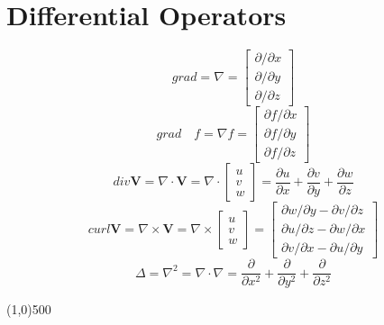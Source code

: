 \documentclass[12pt]{extarticle}
\begin{document}
\section*{Differential Operators}
\begin{equation}
grad = \nabla = \begin{bmatrix}
       \partial/\partial x           \\[0.3em]
       \partial/\partial y  \\[0.3em]
       \partial/\partial z
     \end{bmatrix}
\end{equation}
\begin{equation}
grad \quad f = \nabla f = \begin{bmatrix}
       \partial f/\partial x           \\[0.3em]
       \partial f/\partial y  \\[0.3em]
       \partial f/\partial z
     \end{bmatrix}
\end{equation}
\begin{equation}
div \textbf{V} = \nabla \cdot  \textbf{V} = \nabla \cdot  \begin{bmatrix}
       u           \\[0.3em]
       v  \\[0.3em]
       w
     \end{bmatrix} = \frac{\partial u}{\partial x} + \frac{\partial v}{\partial y} + \frac{\partial w}{\partial z}
\end{equation}
\begin{equation}
curl \textbf{V} = \nabla \times \textbf{V} = \nabla \times \begin{bmatrix}
       u           \\[0.3em]
       v  \\[0.3em]
       w
     \end{bmatrix} = \begin{bmatrix}
       \partial w/\partial y-\partial v/\partial z          \\[0.3em]
       \partial u/\partial z-\partial w/\partial x  \\[0.3em]
       \partial v/\partial x-\partial u/\partial y
     \end{bmatrix}
\end{equation}
\begin{equation}
\Delta = \nabla^{2} = \nabla \cdot \nabla =\frac{\partial }{\partial x^{2}} + \frac{\partial }{\partial y^{2}} + \frac{\partial }{\partial z^{2}}
\end{equation}
\begin{center}
\line(1,0){500}
\end{center}
\end{document}
